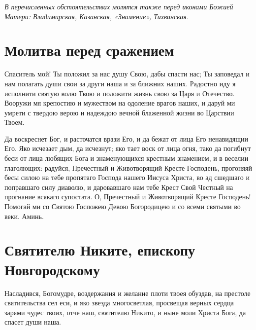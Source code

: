 \itshape В перечисленных обстоятельствах молятся также перед иконами Божией Матери: Владимирская, Казанская, «Знамение», Тихвинская.\normalfont{}

\section{Молитва перед сражением}
 

Спаситель мой! Ты положил за нас душу Свою, дабы спасти нас; Ты заповедал и нам полагать души свои за други наша и за ближних наших. Радостно иду я исполнити святую волю Твою и положити жизнь свою за Царя и Отечество. Вооружи мя крепостию и мужеством на одоление врагов наших, и даруй ми умрети с твердою верою и надеждою вечной блаженной жизни во Царствии Твоем.




Да воскреснет Бог, и расточатся врази Его, и да бежат от лица Его ненавидящии Его. Яко исчезает дым, да исчезнут; яко тает воск от лица огня, тако да погибнут беси от лица любящих Бога и знаменующихся крестным знамением, и в веселии глаголющих: радуйся, Пречестный и Животворящий Кресте Господень, прогоняяй бесы силою на тебе пропятаго Господа нашего Иисуса Христа, во ад сшедшаго и поправшаго силу диаволю, и даровавшаго нам тебе Крест Свой Честный на прогнание всякаго супостата. О, Пречестный и Животворящий Кресте Господень! Помогай ми со Святою Госпожею Девою Богородицею и со всеми святыми во веки. Аминь.
\mychapterending


 

\section{Святителю Никите, епископу Новгородскому}
 




Насладився, Богомудре, воздержания и желание плоти твоея обуздав, на престоле святительства сел еси, и яко звезда многосветлая, просвещая верных сердца зарями чудес твоих, отче наш, святителю Никито, и ныне моли Христа Бога, да спасет души наша.





